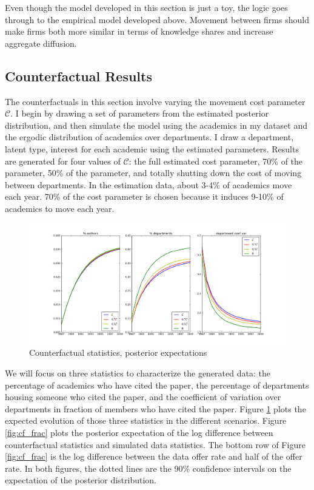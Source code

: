 Even though the model developed in this section is just a toy, the logic
goes through to the empirical model developed above. Movement between
firms should make firms both more similar in terms of knowledge shares and increase aggregate diffusion.
\subsection{Counterfactual Results}

The counterfactuals in this section involve varying the movement cost parameter $\mathcal{C}$. 
I begin  by drawing a set of parameters from the
estimated posterior distribution, and then simulate the model using the academics 
in my dataset and the ergodic distribution of academics over departments. I draw a
department, latent type, interest for each academic using the estimated
parameters. Results are generated for four values of
$\mathcal{C}$: the full estimated cost parameter, 70\% of the parameter, 50\% of the parameter, and totally shutting down the cost of moving between departments.  In the estimation data, about 3-4\% of academics move each year.  70\% of the cost parameter is chosen because it induces 9-10\% of academics to move each year.

\begin{figure}[!ht]
    \includegraphics[scale=0.35]{pics/sim_plots_cf.png}
    \caption{Counterfactual statistics, posterior expectations}
    \label{fig:cf}
\end{figure}

We will focus on three statistics to characterize the generated data: the percentage of academics who
have cited the paper, the percentage of departments housing someone who cited the
paper, and the coefficient of variation over departments in fraction of members who
have cited the paper. Figure \ref{fig:cf} plots the expected evolution
of those three statistics in the different scenarios. Figure \ref{fig:cf_frac} plots
the posterior expectation of the log
difference between counterfactual statistics and simulated data statistics. The bottom row of Figure \ref{fig:cf_frac}
is the log difference between the data offer rate and half of the offer rate.  In both figures,
the dotted lines are the 90\% confidence intervals on the
expectation of the posterior distribution.

